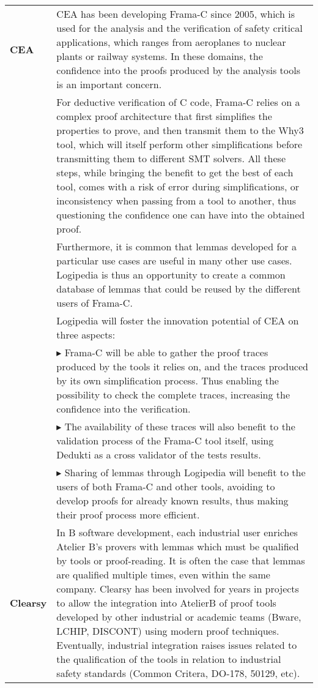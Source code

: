 \begin{longtable*}{|p{0.10\textwidth}|p{0.85\textwidth}|}
\hline
{\bf CEA}
&
CEA has been developing Frama-C since 2005, which is used for the analysis and
the verification of safety critical applications, which ranges from aeroplanes
to nuclear plants or railway systems. In these domains, the confidence
into the proofs produced by the analysis tools is an important concern.
\\

&
\hspace{0.4cm}
For deductive verification of C code, Frama-C relies on
a complex proof architecture that first simplifies the properties to prove,
and then transmit them to the Why3 tool, which will itself perform other
simplifications before transmitting them to different SMT solvers. All
these steps, while bringing the benefit to get the best of each tool, comes
with a risk of error during simplifications, or inconsistency when passing
from a tool to another, thus questioning the confidence one can have into
the obtained proof.
\\

&
\hspace{0.4cm}
Furthermore, it is common that lemmas developed for a particular use
cases are useful in many other use cases. Logipedia is thus an opportunity
to create a common database of lemmas that could be reused by the different
users of Frama-C.
\\

&
\hspace{0.4cm}
Logipedia will foster the innovation potential of CEA on three aspects:
\\

& $\blacktriangleright$ Frama-C will be able to gather the proof
traces produced by the tools it relies on, and the traces produced by
its own simplification process. Thus enabling the possibility to check
the complete traces, increasing the confidence into the verification.\\
& $\blacktriangleright$ The availability of these traces will also
benefit to the validation process of the Frama-C tool itself, using
Dedukti as a cross validator of the tests results.\\
& $\blacktriangleright$ Sharing of lemmas through Logipedia will
benefit to the users of both Frama-C and other tools, avoiding to
develop proofs for already known results, thus making their proof
process more efficient.

\\
\hline
{\bf Clearsy}
&
In B software development, each
industrial user enriches Atelier B's provers with lemmas which must be
qualified by tools or proof-reading.  It is often the case that lemmas
are qualified multiple times, even within the same company.  Clearsy
has been involved for years in projects to allow the integration into
AtelierB of proof tools developed by other industrial or academic teams
(Bware, LCHIP, DISCONT) using modern proof techniques.  Eventually,
industrial integration raises issues related to the qualification of
the tools in relation to industrial safety standards (Common Critera,
DO-178, 50129, etc).
\\


\end{longtable*}
